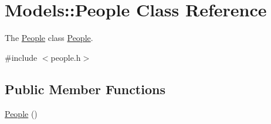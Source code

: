 \hypertarget{classModels_1_1People}{\section{Models\-:\-:People Class Reference}
\label{classModels_1_1People}
}


The \hyperlink{classModels_1_1People}{People} class \hyperlink{classModels_1_1People}{People}.  




{\ttfamily \#include $<$people.\-h$>$}

\subsection*{Public Member Functions}
\begin{DoxyCompactItemize}
\item 
\hypertarget{classModels_1_1People_acdd7ec9d2f9815aeb230ca450cbcdbe3}{\hyperlink{classModels_1_1People_acdd7ec9d2f9815aeb230ca450cbcdbe3}{People} ()}\label{classModels_1_1People_acdd7ec9d2f9815aeb230ca450cbcdbe3}


\end{DoxyCompactItemize}
